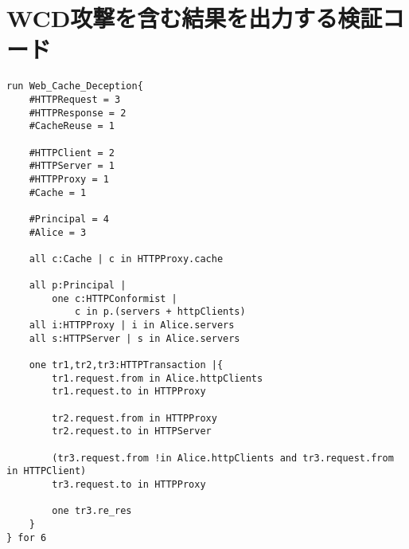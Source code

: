 \documentclass[journal]{IEEEtran}
\begin{document}
\section{WCD攻撃を含む結果を出力する検証コード}

\begin{lstlisting}[caption=WCD攻撃の表現, label=code:WCD]
run Web_Cache_Deception{
	#HTTPRequest = 3
	#HTTPResponse = 2
	#CacheReuse = 1

	#HTTPClient = 2
	#HTTPServer = 1
	#HTTPProxy = 1
	#Cache = 1

	#Principal = 4
	#Alice = 3

	all c:Cache | c in HTTPProxy.cache

	all p:Principal |
		one c:HTTPConformist |
			c in p.(servers + httpClients)
	all i:HTTPProxy | i in Alice.servers
	all s:HTTPServer | s in Alice.servers

	one tr1,tr2,tr3:HTTPTransaction |{
		tr1.request.from in Alice.httpClients
		tr1.request.to in HTTPProxy

		tr2.request.from in HTTPProxy
		tr2.request.to in HTTPServer

		(tr3.request.from !in Alice.httpClients and tr3.request.from in HTTPClient)
		tr3.request.to in HTTPProxy

		one tr3.re_res
	}
} for 6
\end{lstlisting}

\end{document}
